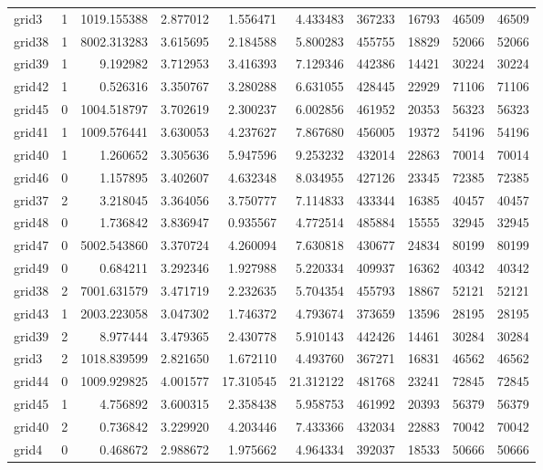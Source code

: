 \documentclass[../../../thesis.tex]{subfiles}
\begin{document}
\begin{longtable}{|l|r|r|r|r|r|r|r|r|r|}
grid3 & 1 & 1019.155388 & 2.877012 & 1.556471 & 4.433483 & 367233 & 16793 & 46509 & 46509 \\
grid38 & 1 & 8002.313283 & 3.615695 & 2.184588 & 5.800283 & 455755 & 18829 & 52066 & 52066 \\
grid39 & 1 & 9.192982 & 3.712953 & 3.416393 & 7.129346 & 442386 & 14421 & 30224 & 30224 \\
grid42 & 1 & 0.526316 & 3.350767 & 3.280288 & 6.631055 & 428445 & 22929 & 71106 & 71106 \\
grid45 & 0 & 1004.518797 & 3.702619 & 2.300237 & 6.002856 & 461952 & 20353 & 56323 & 56323 \\
grid41 & 1 & 1009.576441 & 3.630053 & 4.237627 & 7.867680 & 456005 & 19372 & 54196 & 54196 \\
grid40 & 1 & 1.260652 & 3.305636 & 5.947596 & 9.253232 & 432014 & 22863 & 70014 & 70014 \\
grid46 & 0 & 1.157895 & 3.402607 & 4.632348 & 8.034955 & 427126 & 23345 & 72385 & 72385 \\
grid37 & 2 & 3.218045 & 3.364056 & 3.750777 & 7.114833 & 433344 & 16385 & 40457 & 40457 \\
grid48 & 0 & 1.736842 & 3.836947 & 0.935567 & 4.772514 & 485884 & 15555 & 32945 & 32945 \\
grid47 & 0 & 5002.543860 & 3.370724 & 4.260094 & 7.630818 & 430677 & 24834 & 80199 & 80199 \\
grid49 & 0 & 0.684211 & 3.292346 & 1.927988 & 5.220334 & 409937 & 16362 & 40342 & 40342 \\
grid38 & 2 & 7001.631579 & 3.471719 & 2.232635 & 5.704354 & 455793 & 18867 & 52121 & 52121 \\
grid43 & 1 & 2003.223058 & 3.047302 & 1.746372 & 4.793674 & 373659 & 13596 & 28195 & 28195 \\
grid39 & 2 & 8.977444 & 3.479365 & 2.430778 & 5.910143 & 442426 & 14461 & 30284 & 30284 \\
grid3 & 2 & 1018.839599 & 2.821650 & 1.672110 & 4.493760 & 367271 & 16831 & 46562 & 46562 \\
grid44 & 0 & 1009.929825 & 4.001577 & 17.310545 & 21.312122 & 481768 & 23241 & 72845 & 72845 \\
grid45 & 1 & 4.756892 & 3.600315 & 2.358438 & 5.958753 & 461992 & 20393 & 56379 & 56379 \\
grid40 & 2 & 0.736842 & 3.229920 & 4.203446 & 7.433366 & 432034 & 22883 & 70042 & 70042 \\
grid4 & 0 & 0.468672 & 2.988672 & 1.975662 & 4.964334 & 392037 & 18533 & 50666 & 50666 \\

\end{longtable}
\end{document}
